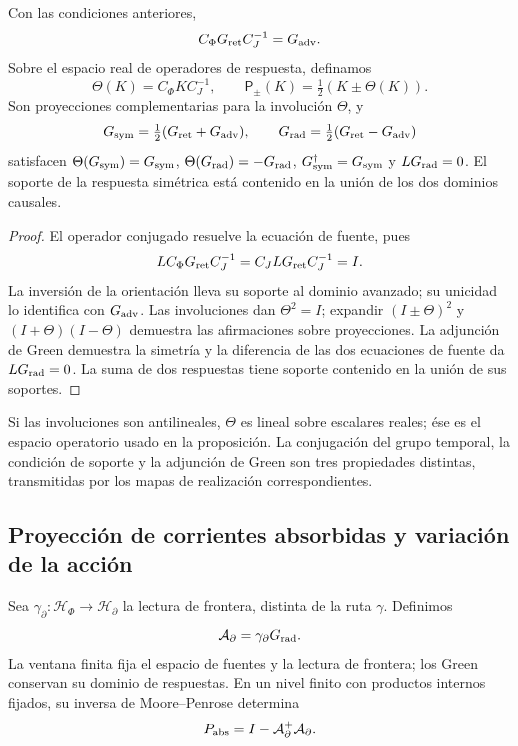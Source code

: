\begin{proposition}
\label{vii:vii:prop:green-paridades}
Con las condiciones anteriores,
\[
 C_\Phi G_{\rm ret}C_J^{-1}=G_{\rm adv}.
\]
Sobre el espacio real de operadores de respuesta, definamos
\[
 \Theta(K)=C_\Phi K C_J^{-1},\qquad
 \mathsf P_\pm(K)=\tfrac12(K\pm\Theta(K)).
\]
Son proyecciones complementarias para la involución \(\Theta\), y
\begin{equation}
 G_{\rm sym}=\tfrac12(G_{\rm ret}+G_{\rm adv}),\qquad
 G_{\rm rad}=\tfrac12(G_{\rm ret}-G_{\rm adv})
 \label{vii:vii:eq:descomposicion-green}
\end{equation}
satisfacen \(\Theta(G_{\rm sym})=G_{\rm sym}\),
\(\Theta(G_{\rm rad})=-G_{\rm rad}\),
\(G_{\rm sym}^{\dagger}=G_{\rm sym}\) y
\(LG_{\rm rad}=0\). El soporte de la respuesta simétrica está contenido
en la unión de los dos dominios causales.
\end{proposition}
\begin{proof}
El operador conjugado resuelve la ecuación de fuente, pues
\[
 LC_\Phi G_{\rm ret}C_J^{-1}=C_JLG_{\rm ret}C_J^{-1}=I.
\]
La inversión de la orientación lleva su soporte al dominio avanzado;
su unicidad lo identifica con \(G_{\rm adv}\). Las involuciones dan
\(\Theta^2=I\); expandir \((I\pm\Theta)^2\) y
\((I+\Theta)(I-\Theta)\) demuestra las afirmaciones sobre proyecciones.
La adjunción de Green demuestra la simetría y la diferencia de las dos
ecuaciones de fuente da \(LG_{\rm rad}=0\). La suma de dos respuestas
tiene soporte contenido en la unión de sus soportes.
\end{proof}

Si las involuciones son antilineales, \(\Theta\) es lineal sobre
escalares reales; ése es el espacio operatorio usado en la proposición.
La conjugación del grupo temporal, la condición de soporte y la
adjunción de Green son tres propiedades distintas, transmitidas por los
mapas de realización correspondientes.

\subsection{Proyección de corrientes absorbidas y variación de la acción}
\label{vii:vii:subsec:proyeccion-absorcion}

Sea \(\gamma_\partial:\mathcal H_\Phi\to\mathcal H_\partial\)
la lectura de frontera, distinta de la ruta \(\gamma\). Definimos
\[
 \mathcal A_\partial=\gamma_\partial G_{\rm rad}.
\]
La ventana finita fija el espacio de fuentes y la lectura de frontera;
los Green conservan su dominio de respuestas. En un nivel finito con
productos internos fijados, su inversa de
Moore--Penrose determina
\begin{equation}
 P_{\rm abs}=I-\mathcal A_\partial^+\mathcal A_\partial.
 \label{vii:vii:eq:proyector-absorcion}
\end{equation}

